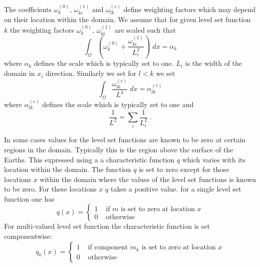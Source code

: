 The coefficients $\omega^{(0)}_k$, $\omega^{(1)}_{ki}$ and $\omega^{(c)}_{lk}$ define weighting factors which 
may depend on their location within the domain. We assume that for given level set function $k$ the 
weighting factors $\omega^{(0)}_k$, $\omega^{(1)}_{ki}$ are scaled such that 
\begin{equation}\label{ref:EQU:REG:5}
\int_{\Omega} ( \omega^{(0)}_k  + \frac{\omega^{(1)}_{ki}}{L_i^2} ) \; dx = \alpha_k 
\end{equation} 
where $\alpha_k$ defines the scale which is typically set to one. $L_i$ is the width of the domain in $x_i$ direction.
Similarly we set for $l<k$ we set 
\begin{equation}\label{ref:EQU:REG:6}
\int_{\Omega} \frac{\omega^{(c)}_{lk}}{L^4} \; dx = \alpha^{(c)}_{lk}
\end{equation} 
where $\alpha^{(c)}_{lk}$ defines the scale which is typically set to one and
\begin{equation}\label{ref:EQU:REG:6b}
\frac{1}{L^2} = \sum_i \frac{1}{L_i^2} \;.
\end{equation} 

In some cases values for the level set functions are known to be zero at certain regions in the domain. Typically this is the region 
above the surface of the Earths. This expressed using a
a characteristic function $q$ which varies with its location within the domain. The function $q$ is set to zero except for those 
locations $x$ within the domain where the values of the level set functions is known to be zero. For these locations $x$
$q$ takes a positive value. for a single level set function one has
\begin{equation}\label{ref:EQU:REG:7}
q(x) = \left\{ 
\begin{array}{rl}
  1 & \mbox{ if } m \mbox{ is set to zero at location } x \\
  0 & \mbox{ otherwise }
\end{array}
\right.
\end{equation} 
For multi-valued level set function the  characteristic function is set componentwise:
\begin{equation}\label{ref:EQU:REG:7b}
q_k(x) = \left\{ 
\begin{array}{rl}
  1 & \mbox{ if component } m_k \mbox{ is set to zero at location } x \\
  0 & \mbox{ otherwise }
\end{array}
\right.
\end{equation} 


